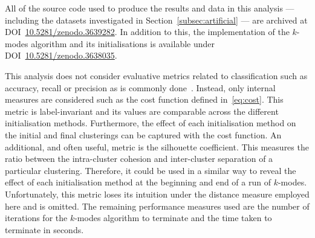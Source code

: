 \documentclass[11pt]{article}
\begin{document}
\begin{table}[htbp]
    \caption{A summary of the benchmark datasets.}\label{tab:dataset_summary}
\end{table}

All of the source code used to produce the results and data in this analysis ---
including the datasets investigated in Section~\ref{subsec:artificial} --- are
archived at
DOI~\href{https://doi.org/10.5281/zenodo.3639282}{10.5281/zenodo.3639282}. In
addition to this, the implementation of the \(k\)-modes algorithm and its
initialisations is available under
DOI~\href{https://doi.org/10.5281/zenodo.3638035}{10.5281/zenodo.3638035}.

This analysis does not consider evaluative metrics related to classification
such as accuracy, recall or precision as is commonly done~\cite{%
    Arthur2007,Cao2009,Cao2012,Huang1998,%
    Ng2007,Olaode2014,Schaeffer2007,Sharma2015%
}. Instead, only internal measures are considered such as the cost function
defined in~\eqref{eq:cost}. This metric is label-invariant and its values are
comparable across the different initialisation methods. Furthermore, the effect
of each initialisation method on the initial and final clusterings can be
captured with the cost function. An additional, and often useful, metric is the
silhouette coefficient. This measures the ratio between the intra-cluster
cohesion and inter-cluster separation of a particular clustering. Therefore, it
could be used in a similar way to reveal the effect of each initialisation
method at the beginning and end of a run of \(k\)-modes. Unfortunately, this
metric loses its intuition under the distance measure employed here and is
omitted. The remaining performance measures used are the number of iterations
for the \(k\)-modes algorithm to terminate and the time taken to terminate in
seconds.
\end{document}
